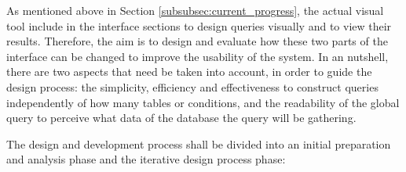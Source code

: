 As mentioned above in Section \ref{subsubsec:current_progress}, the actual visual tool include in the interface sections to design queries visually and to view their results. Therefore, the aim is to design and evaluate how these two parts of the interface can be changed to improve the usability of the system. In an nutshell, there are two aspects that need be taken into account, in order to guide the design process: the simplicity, efficiency and effectiveness to construct queries independently of how many tables or conditions, and the readability of the global query to perceive what data of the database the query will be gathering.


The design and development process shall be divided into an initial preparation and analysis phase and the iterative design process phase:

